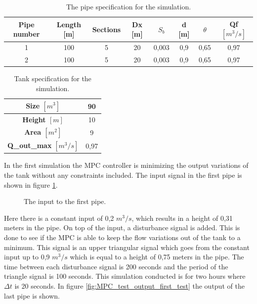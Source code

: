 \begin{table}[H]
\centering
\begin{tabular}{|c|c|c|c|c|c|c|c|}
\hline
	\rowcolor[HTML]{9B9B9B} 
\textbf{Pipe number} & \textbf{Length} [m] & \textbf{Sections} & \textbf{Dx} [m] & \textbf{$S_b$} & \textbf{d} [m] & \textbf{$\theta$} & \textbf{Qf $[m^3/s]$} \\ \hline
1&100             & 5                 & 20          & 0,003       & 0,9        & 0,65              & 0,97        \\ \hline
2&100             & 5                 & 20          & 0,003       & 0,9        & 0,65              & 0,97        \\ \hline
\end{tabular}
\caption{The pipe specification for the simulation.}
\label{tab:pipe_data_for_mpc_test}
\end{table}
\begin{table}[H]
\centering
\begin{tabular}{|c|c|}
\hline
\textbf{Size $[m^3]$}        & 90   \\ \hline
\textbf{Height $[m]$}      & 10   \\ \hline
\textbf{Area $[m^2]$}        & 9    \\ \hline
\textbf{Q\_out\_max} $[m^3/s]$& 0,97 \\ \hline
\end{tabular}
\caption{Tank specification for the simulation.}
\label{tab:tank_data_for_mpc_test}
\end{table}

In the first simulation the MPC controller is minimizing the output variations of the tank without any constraints included. The input signal in the first pipe is shown in figure \ref{fig:input_to_pipe_mpc_test}. 
\begin{figure}[H]
 \centering
 
\caption{The input to the first pipe.}
\label{fig:input_to_pipe_mpc_test}
\end{figure}

Here there is a constant input of 0,2 $m^3/s$, which results in a height of 0,31 meters in the pipe. On top of the input, a disturbance signal is added. This is done to see if the MPC is able to keep the flow variations out of the tank to a minimum. This signal is an upper triangular signal which goes from the constant input up to 0,9 $m^3/s$ which is equal to a height of 0,75 meters in the pipe. The time between each disturbance signal is 200 seconds and the period of the triangle signal is 100 seconds. This simulation conducted is for two hours where $\Delta t$ is 20 seconds. In figure \ref{fig:MPC_test_output_first_test} the output of the last pipe is shown.  


